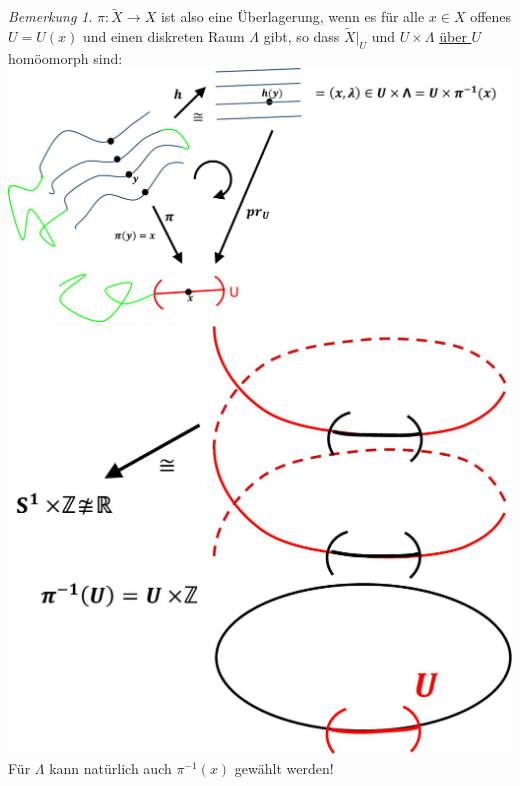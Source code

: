 \documentclass[a4paper,11pt,notitlepage]{report}
\theoremstyle{remark}
\newtheorem{remark}{Bemerkung}[chapter]
\theoremstyle{definition}
\begin{document}
\begin{remark}
	$\pi \colon \tilde{X} \rightarrow X$ ist also eine Überlagerung, wenn es für alle $x \in X$ offenes $U=U(x)$ und einen diskreten Raum $\Lambda$ gibt, so dass $\tilde{X} \big |_U$ und $U \times \Lambda$ \underline{über $U$} homöomorph sind:
	\includegraphics[scale=0.4]{images/lokal_trivialisierend.jpg} \newline
	\includegraphics[scale=0.4]{images/lokal_trivialisierend2.jpg} \newline
	Für $\Lambda$ kann natürlich auch $\pi^{-1}(x)$ gewählt werden!
\end{remark}
\end{document}
